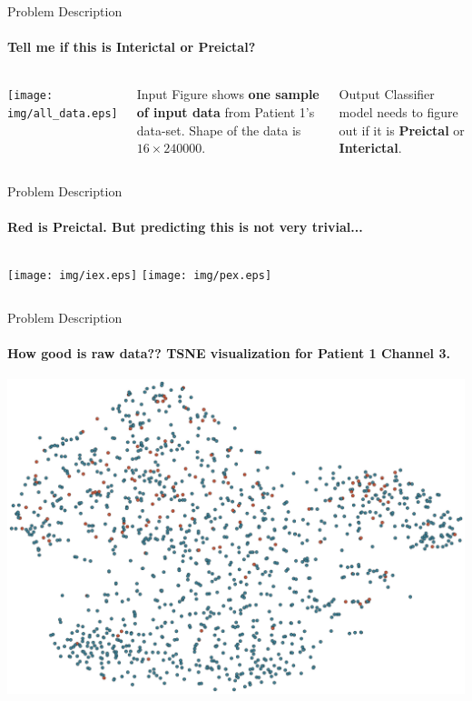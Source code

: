 \documentclass{beamer}
\begin{document}
\begin{frame}{Problem Description}
  \framesubtitle{Tell me if this is Interictal or Preictal?}
  \begin{columns}
    \hspace*{-0.9cm}
    \texttt{[image: img/all\_data.eps]}
    \begin{block}{Input}
      Figure shows \textbf{one sample of input data} from Patient 1's data-set.
      Shape of the data is $16 \times 240000$.
    \end{block}

    \begin{block}{Output}
      Classifier model needs to figure out if it is \textbf{Preictal} or
      \textbf{Interictal}.
    \end{block}

  \end{columns}
\end{frame}

\begin{frame}{Problem Description}
  \framesubtitle{Red is Preictal. But predicting this is not very trivial...}
  
  \begin{columns}
    \texttt{[image: img/iex.eps]}
    \texttt{[image: img/pex.eps]}

  \end{columns}
\end{frame}


\begin{frame}{Problem Description}
  \framesubtitle{How good is raw data?? TSNE visualization for Patient 1 Channel 3.}
  \begin{center}
    \vspace*{-0.5cm}
    \includegraphics[scale=0.32]{img/tsne_raw_data.eps}
  \end{center}
\end{frame}
\end{document}

